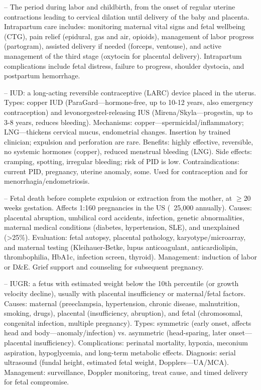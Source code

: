 -- The period during labor and childbirth, from the onset of regular uterine contractions leading to cervical dilation until delivery of the baby and placenta. Intrapartum care includes: monitoring maternal vital signs and fetal wellbeing (CTG), pain relief (epidural, gas and air, opioids), management of labor progress (partogram), assisted delivery if needed (forceps, ventouse), and active management of the third stage (oxytocin for placental delivery). Intrapartum complications include fetal distress, failure to progress, shoulder dystocia, and postpartum hemorrhage.

-- IUD: a long-acting reversible contraceptive (LARC) device placed in the uterus. Types: copper IUD (ParaGard—hormone-free, up to 10-12 years, also emergency contraception) and levonorgestrel-releasing IUS (Mirena/Skyla—progestin, up to 3-8 years, reduces bleeding). Mechanisms: copper—spermicidal/inflammatory; LNG—thickens cervical mucus, endometrial changes. Insertion by trained clinician; expulsion and perforation are rare. Benefits: highly effective, reversible, no systemic hormones (copper), reduced menstrual bleeding (LNG). Side effects: cramping, spotting, irregular bleeding; risk of PID is low. Contraindications: current PID, pregnancy, uterine anomaly, some. Used for contraception and for menorrhagia/endometriosis.

-- Fetal death before complete expulsion or extraction from the mother, at \(\ge\)20 weeks gestation. Affects 1:160 pregnancies in the US (~25,000 annually). Causes: placental abruption, umbilical cord accidents, infection, genetic abnormalities, maternal medical conditions (diabetes, hypertension, SLE), and unexplained (>25\%). Evaluation: fetal autopsy, placental pathology, karyotype/microarray, and maternal testing (Kleihauer-Betke, lupus anticoagulant, anticardiolipin, thrombophilia, HbA1c, infection screen, thyroid). Management: induction of labor or D\&E. Grief support and counseling for subsequent pregnancy.

-- IUGR: a fetus with estimated weight below the 10th percentile (or growth velocity decline), usually with placental insufficiency or maternal/fetal factors. Causes: maternal (preeclampsia, hypertension, chronic disease, malnutrition, smoking, drugs), placental (insufficiency, abruption), and fetal (chromosomal, congenital infection, multiple pregnancy). Types: symmetric (early onset, affects head and body—anomaly/infection) vs. asymmetric (head-sparing, later onset—placental insufficiency). Complications: perinatal mortality, hypoxia, meconium aspiration, hypoglycemia, and long-term metabolic effects. Diagnosis: serial ultrasound (fundal height, estimated fetal weight, Dopplers—UA/MCA). Management: surveillance, Doppler monitoring, treat cause, and timed delivery for fetal compromise.

